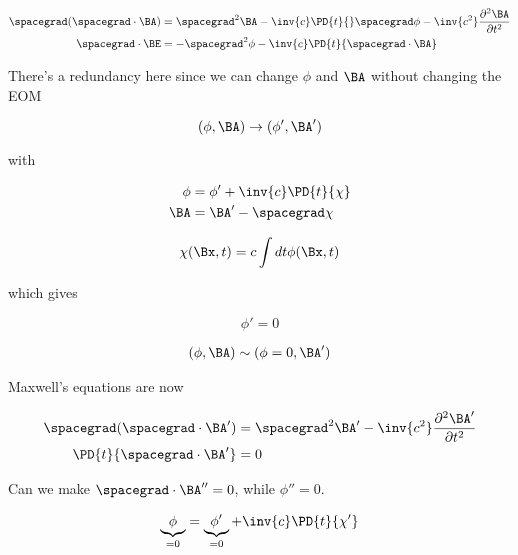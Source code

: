 \begin{align}\label{eqn:relativisticElectrodynamicsL14:30}
\spacegrad (\spacegrad \cdot \BA) &= \spacegrad^2 \BA  -\inv{c} \PD{t}{} \spacegrad \phi - \inv{c^2} \frac{\partial^2 \BA}{\partial t^2} \\
\spacegrad \cdot \BE &= - \spacegrad^2 \phi - \inv{c} \PD{t}{\spacegrad \cdot \BA} 
\end{align}

There's a redundancy here since we can change $\phi$ and $\BA$ without changing the EOM

\begin{equation}\label{eqn:relativisticElectrodynamicsL14:50}
(\phi, \BA) \rightarrow (\phi', \BA')
\end{equation}

with

\begin{align}\label{eqn:relativisticElectrodynamicsL14:70}
\phi &= \phi' + \inv{c} \PD{t}{\chi} \\
\BA &= \BA' - \spacegrad \chi
\end{align}

\begin{equation}\label{eqn:relativisticElectrodynamicsL14:90}
\chi(\Bx, t) = c \int dt \phi(\Bx, t)
\end{equation}

which gives 

\begin{equation}\label{eqn:relativisticElectrodynamicsL14:110}
\phi' = 0
\end{equation}

\begin{align}\label{eqn:relativisticElectrodynamicsL14:130}
(\phi, \BA) \sim (\phi = 0, \BA')
\end{align}

Maxwell's equations are now

\begin{align*}
\spacegrad (\spacegrad \cdot \BA') &= \spacegrad^2 \BA'  - \inv{c^2} \frac{\partial^2 \BA'}{\partial t^2} \\
\PD{t}{\spacegrad \cdot \BA'}  &= 0
\end{align*}

Can we make $\spacegrad \cdot \BA'' = 0$, while $\phi'' = 0$.

\begin{align}\label{eqn:relativisticElectrodynamicsL14:150}
\underbrace{\phi}_{=0} &= \underbrace{\phi'}_{=0} + \inv{c} \PD{t}{\chi'} \\
\end{align}

